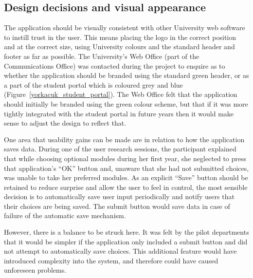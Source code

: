 
\subsection{Design decisions and visual appearance}

The application should be visually consistent with other University web
software to instill trust in the user. This means placing the logo in the
correct position and at the correct size, using University colours and the
standard header and footer as far as possible. The University's Web Office
(part of the Communications Office) was contacted during the project to
enquire as to whether the application should be branded using the standard
green header, or as a part of the student portal which is coloured grey and
blue (Figure~\ref{yorkacuk_student_portal}). The Web Office felt that the
application should initially be branded using the green colour scheme, but
that if it was more tightly integrated with the student portal in future years
then it would make sense to adjust the design to reflect that.

One area that usability gains can be made are in relation to how the
application saves data. During one of the user research sessions, the
participant explained that while choosing optional modules during her first
year, she neglected to press that application's ``OK'' button and, unaware
that she had not submitted choices, was unable to take her preferred modules.
As an explicit ``Save'' button should be retained to reduce surprise and allow
the user to feel in control, the most sensible decision is to automatically
save user input periodically and notify users that their choices are being
saved. The submit button would save data in case of failure of the automatic
save mechanism.

However, there is a balance to be struck here. It was felt by the pilot
departments that it would be simpler if the application only included a submit
button and did not attempt to automatically save choices. This additional
feature would have introduced complexity into the system, and therefore could
have caused unforeseen problems.
